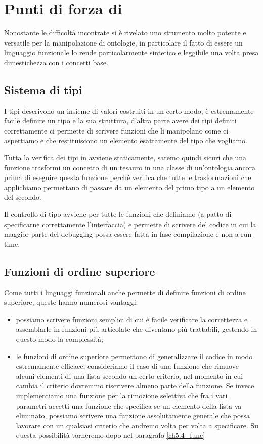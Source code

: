 \section{Punti di forza di \cduce}
Nonostante le difficoltà incontrate \cduce si è rivelato uno strumento molto potente e versatile per la manipolazione di ontologie, in particolare il fatto di essere un linguaggio funzionale lo rende particolarmente sintetico e leggibile una volta presa dimestichezza con i concetti base.
\subsection{Sistema di tipi}
I tipi descrivono un insieme di valori costruiti in un certo modo, è estremamente facile definire un tipo e la sua struttura, d'altra parte avere dei tipi definiti correttamente ci permette di scrivere funzioni che li manipolano come ci aspettiamo e che restituiscono un elemento esattamente del tipo che vogliamo.

Tutta la verifica dei tipi in \cduce avviene staticamente, saremo quindi sicuri che una funzione trasformi un concetto di un tesauro in una classe di un'ontologia ancora prima di eseguire questa funzione perché \cduce verifica che tutte le trasformazioni che applichiamo permettano di passare da un elemento del primo tipo a un elemento del secondo.

Il controllo di tipo avviene per tutte le funzioni che definiamo (a patto di specificarne correttamente l'interfaccia) e permette di scrivere del codice in cui la maggior parte del debugging possa essere fatta in fase compilazione e non a run-time. 

\subsection{Funzioni di ordine superiore}
Come tutti i linguaggi funzionali anche \cduce permette di definire funzioni di ordine superiore, queste hanno numerosi vantaggi: 
\begin{itemize}
	\item possiamo scrivere funzioni semplici di cui è facile verificare la correttezza e assemblarle in funzioni più articolate che diventano più trattabili, gestendo in questo modo la complessità;
	\item le funzioni di ordine superiore permettono di generalizzare il codice in modo estremamente efficace, consideriamo il caso di una funzione che rimuove alcuni elementi di una lista secondo un certo criterio, nel momento in cui cambia il criterio dovremmo riscrivere almeno parte della funzione. Se invece implementiamo una funzione per la rimozione selettiva che fra i vari parametri accetti una funzione che specifica se un elemento della lista va eliminato, possiamo scrivere una funzione assolutamente generale che possa lavorare con un qualsiasi criterio che andremo volta per volta a specificare. Su questa possibilità torneremo dopo nel paragrafo \ref{ch5.4_func}
\end{itemize}
